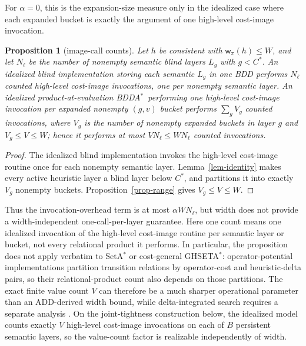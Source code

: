 \documentclass[letterpaper]{article}
\newcommand{\copt}{\ensuremath{C^{*}}}
\newcommand{\width}{\ensuremath{\mathsf{w}}}
\newcommand{\values}{\ensuremath{V}}
\newcommand{\bddastar}{BDDA\ensuremath{^{*}}}
\newcommand{\ghseta}{GHSETA\ensuremath{^{*}}}
\theoremstyle{plain}
\newtheorem{proposition}{Proposition}
\theoremstyle{definition}
\theoremstyle{remark}
\begin{document}
For $\alpha=0$, this is the expansion-size measure only in the idealized case
where each expanded bucket is exactly the argument of one high-level
cost-image invocation.

\begin{proposition}[image-call counts]
\label{prop-calls}
Let $h$ be consistent with $\width_\pi(h)\leq W$, and let $N_\ell$ be
the number of nonempty semantic blind layers $L_g$ with $g<\copt$. An
idealized blind implementation storing each semantic $L_g$ in one BDD performs
$N_\ell$ counted high-level cost-image invocations, one per nonempty semantic
layer. An idealized product-at-evaluation
\bddastar\ performing one high-level cost-image invocation per expanded
nonempty $(g,v)$ bucket performs $\sum_g\values_g$ counted invocations, where
$\values_g$ is the number of nonempty expanded buckets in layer $g$ and
$\values_g\leq\values\leq W$; hence it performs at most
$\values N_\ell\leq WN_\ell$ counted invocations.
\end{proposition}

\begin{proof}
The idealized blind implementation invokes the high-level cost-image routine
once for each nonempty semantic layer.
Lemma~\ref{lem-identity} makes every active heuristic layer a blind layer
below $\copt$, and partitions it into exactly $\values_g$ nonempty
buckets. Proposition~\ref{prop-range} gives
$\values_g\leq\values\leq W$.
\end{proof}

Thus the invocation-overhead term is at most $\alpha WN_\ell$, but width does
not provide a width-independent one-call-per-layer guarantee. Here one
count means one idealized invocation of the high-level cost-image routine per
semantic layer or bucket, not every relational product it performs. In
particular, the proposition does not
apply verbatim to SetA$^*$ or cost-general \ghseta: operator-potential
implementations partition transition relations by operator-cost and
heuristic-delta pairs, so their relational-product count also depends on
those partitions. The exact finite value count $\values$ can therefore be
a much sharper operational parameter than an ADD-derived width bound, while
delta-integrated search requires a separate analysis
\citep{fiser-et-al-aij2024}. On the joint-tightness construction below, the
idealized model counts exactly $\values$ high-level cost-image invocations on
each of $B$ persistent semantic layers, so the value-count factor is
realizable independently of width.
\end{document}

